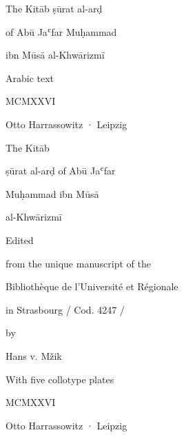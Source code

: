 \documentclass[11pt]{article}
\begin{document}
\begin{center}\large The Kitāb ṣūrat al-arḍ\end{center}

\begin{center}\large of Abū Jaʿfar Muḥammad\end{center}

\begin{center}\large ibn Mūsā al-Khwārizmī\end{center}

\begin{center}\large Arabic text\end{center}

\begin{center}\large MCMXXVI\end{center}

\begin{center}\large Otto Harrassowitz · Leipzig\end{center}

\clearpage

\begin{center}\large The Kitāb\end{center}

\begin{center}\large ṣūrat al-arḍ of Abū Jaʿfar\end{center}

\begin{center}\large Muḥammad ibn Mūsā\end{center}

\begin{center}\large al-Khwārizmī\end{center}

\begin{center}\large Edited\end{center}

\begin{center}\large from the unique manuscript of the\end{center}

\begin{center}\large Bibliothèque de l’Université et Régionale\end{center}

\begin{center}\large in Strasbourg / Cod. 4247 /\end{center}

\begin{center}\large by\end{center}

\begin{center}\large Hans v. Mžik\end{center}

\begin{center}\large With five collotype plates\end{center}

\begin{center}\large MCMXXVI\end{center}

\begin{center}\large Otto Harrassowitz · Leipzig\end{center}
\end{document}
